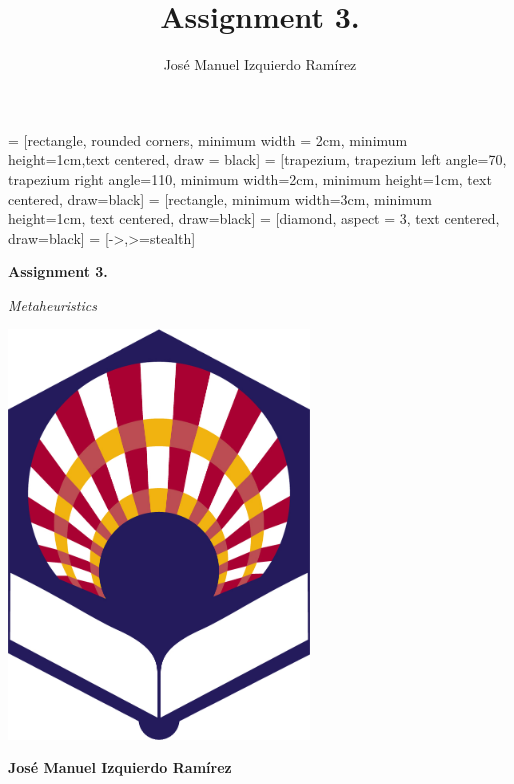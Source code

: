 \documentclass{article}
\title{Assignment 3.}
\author{José Manuel Izquierdo Ramírez}
\begin{document}
     = [rectangle, rounded corners, minimum width = 2cm, minimum height=1cm,text centered, draw = black]
     = [trapezium, trapezium left angle=70, trapezium right angle=110, minimum width=2cm, minimum height=1cm, text centered, draw=black]
     = [rectangle, minimum width=3cm, minimum height=1cm, text centered, draw=black]
     = [diamond, aspect = 3, text centered, draw=black]
     = [->,>=stealth]

    \begin{titlepage}
        
        \centering
        {\LARGE\bfseries Assignment 3. \par}
        \vspace{0,5cm}
        {\itshape\Large Metaheuristics \par}
        \vspace{0,5cm}        
        \vspace{1cm}
        \includegraphics[width=0.6\textwidth]{../media/Logo_UCO.png}\par
        \vspace{3cm}
        {\LARGE\bfseries José Manuel Izquierdo Ramírez \par}


    \end{titlepage}
    
    \begin{index}
        \tableofcontents
        \newpage
        \listoffigures
    \end{index}
\end{document}

